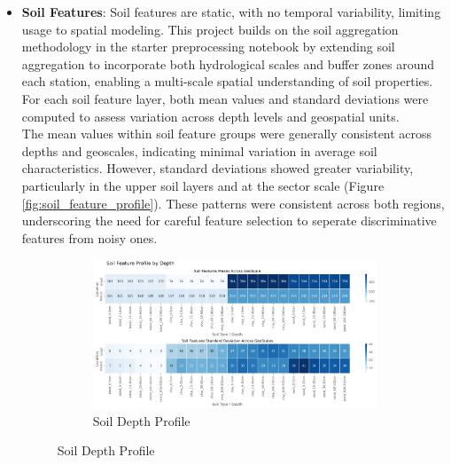 \documentclass[ruler]{CUP-JNL-EDS}%
\begin{document}
\begin{itemize}
    \item{\textbf{Soil Features}}: Soil features are static, with no temporal variability, limiting usage to 
    spatial modeling. This project builds on the soil aggregation methodology in the starter preprocessing notebook 
    by extending soil aggregation to incorporate both hydrological scales and buffer zones around 
    each station, enabling a multi-scale spatial understanding of soil properties. For each soil feature 
    layer, both mean values and standard deviations were computed to assess variation across depth levels 
    and geospatial units.\\ 
    The mean values within soil feature groups were generally consistent across depths and geoscales, 
    indicating minimal variation in average soil characteristics. However, standard deviations 
    showed greater variability, particularly in the upper soil layers and at the sector scale (Figure \ref{fig:soil_feature_profile}). 
    These patterns were consistent across both regions, underscoring the need for careful feature
    selection to seperate discriminative features from noisy ones.\\
    \begin{figure}[!htbp]
        \centering
        \begin{subfigure}[h]{1.0\textwidth}
            \centering
            \includegraphics[width=\textwidth]{./assets/images/soil_feature_profile_depth.png}
            \caption{Soil Depth Profile}
            \label{fig:soil_feature_profile_depth}
        \end{subfigure}


\end{figure}
\end{itemize}
\end{document}
